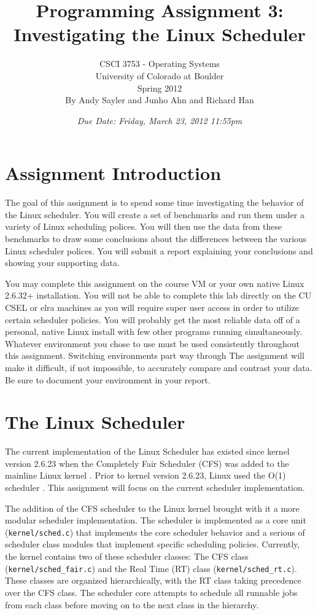 \documentclass[12pt]{article}
\title{Programming Assignment 3:\\Investigating the Linux Scheduler}
\author{
  CSCI 3753 - Operating Systems\\
  University of Colorado at Boulder\\
  Spring 2012\\
  By Andy Sayler and Junho Ahn and Richard Han
}
\date{\emph{Due Date:  Friday, March 23, 2012 11:55pm}}
\begin{document}
\maketitle

\section{Assignment Introduction}

The goal of this assignment is to spend some time investigating the
behavior of the Linux scheduler. You will create a set of benchmarks
and run them under a variety of Linux scheduling polices. You will
then use the data from these benchmarks to draw some conclusions about
the differences between the various Linux scheduler polices. You will
submit a report explaining your conclusions and showing your
supporting data.

You may complete this assignment on the course VM or your own native
Linux 2.6.32+ installation. You will not be able to complete this lab
directly on the CU CSEL or elra machines as you will require super
user access in order to utilize certain scheduler policies.
You will probably get the most reliable data off of a personal, native
Linux install with few other programs running simultaneously. Whatever
environment you chose to use must be used consistently throughout this
assignment. Switching environments part way through The assignment
will make it difficult, if not impossible, to accurately compare and
contrast your data. Be sure to document your environment in your
report.

\section{The Linux Scheduler}

The current implementation of the Linux
Scheduler has existed since kernel version 2.6.23 when the Completely
Fair Scheduler (CFS) was added to the mainline Linux kernel
\cite{Molnar-CFS,Jones-InsideCFS,Kumar-MultiCFS}. Prior to kernel
version 2.6.23, Linux used the O(1) scheduler \cite{Le-StudyLKS}.
This assignment will focus on the current scheduler implementation.

The addition of the CFS scheduler to the Linux kernel brought with it
a more modular scheduler implementation. The scheduler is implemented as
a core unit (\texttt{kernel/sched.c}) that implements the core
scheduler behavior and a serious of scheduler class modules that
implement specific scheduling policies. Currently, the kernel contains
two of these scheduler classes: The CFS class
(\texttt{kernel/sched\_fair.c}) and the Real Time (RT) class
(\texttt{kernel/sched\_rt.c}). These classes are
organized hierarchically,
with the RT class taking precedence over the CFS class. The scheduler
core attempts to schedule all runnable jobs from each class before
moving on to the next class in the hierarchy.
\end{document}
